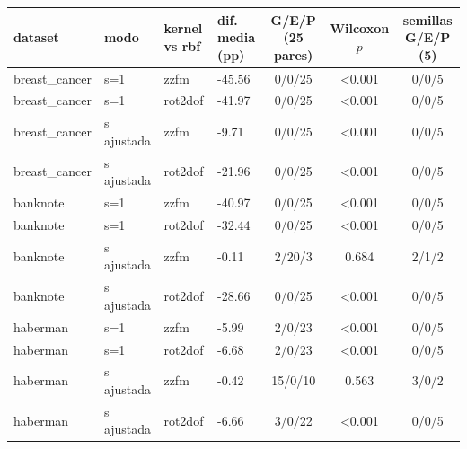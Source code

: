 \begin{tabular}{llllccc}
\hline
dataset & modo & kernel vs rbf & dif. media (pp) & G/E/P (25 pares) & Wilcoxon $p$ & semillas G/E/P (5) \\
\hline
breast\_cancer & s=1 & zzfm & -45.56 & 0/0/25 & <0.001 & 0/0/5 \\
breast\_cancer & s=1 & rot2dof & -41.97 & 0/0/25 & <0.001 & 0/0/5 \\
breast\_cancer & s ajustada & zzfm & -9.71 & 0/0/25 & <0.001 & 0/0/5 \\
breast\_cancer & s ajustada & rot2dof & -21.96 & 0/0/25 & <0.001 & 0/0/5 \\
banknote & s=1 & zzfm & -40.97 & 0/0/25 & <0.001 & 0/0/5 \\
banknote & s=1 & rot2dof & -32.44 & 0/0/25 & <0.001 & 0/0/5 \\
banknote & s ajustada & zzfm & -0.11 & 2/20/3 & 0.684 & 2/1/2 \\
banknote & s ajustada & rot2dof & -28.66 & 0/0/25 & <0.001 & 0/0/5 \\
haberman & s=1 & zzfm & -5.99 & 2/0/23 & <0.001 & 0/0/5 \\
haberman & s=1 & rot2dof & -6.68 & 2/0/23 & <0.001 & 0/0/5 \\
haberman & s ajustada & zzfm & -0.42 & 15/0/10 & 0.563 & 3/0/2 \\
haberman & s ajustada & rot2dof & -6.66 & 3/0/22 & <0.001 & 0/0/5 \\
\hline
\end{tabular}
